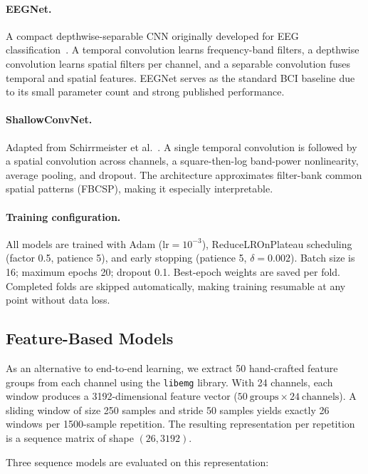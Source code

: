 \documentclass[11pt,twocolumn]{article}
\begin{document}
\paragraph{EEGNet.}
A compact depthwise-separable CNN originally developed for EEG
classification~\cite{lawhern2018eegnet}. A temporal convolution learns
frequency-band filters, a depthwise convolution learns spatial filters per
channel, and a separable convolution fuses temporal and spatial features.
EEGNet serves as the standard BCI baseline due to its small parameter count
and strong published performance.

\paragraph{ShallowConvNet.}
Adapted from Schirrmeister et al.~\cite{schirrmeister2017deep}. A single temporal
convolution is followed by a spatial convolution across channels, a
square-then-log band-power nonlinearity, average pooling, and dropout. The
architecture approximates filter-bank common spatial patterns (FBCSP), making it
especially interpretable.

\paragraph{Training configuration.}
All models are trained with Adam ($\text{lr} = 10^{-3}$),
ReduceLROnPlateau scheduling (factor 0.5, patience 5), and early stopping
(patience 5, $\delta = 0.002$). Batch size is 16; maximum epochs 20; dropout
0.1. Best-epoch weights are saved per fold. Completed folds are skipped
automatically, making training resumable at any point without data loss.

\subsection{Feature-Based Models}
\label{sec:feature}

As an alternative to end-to-end learning, we extract 50 hand-crafted feature
groups from each channel using the \texttt{libemg} library. With 24 channels, each
window produces a 3192-dimensional feature vector
($50\ \text{groups} \times 24\ \text{channels}$). A sliding window of size 250
samples and stride 50 samples yields exactly 26 windows per 1500-sample
repetition. The resulting representation per repetition is a sequence matrix of
shape $(26, 3192)$.

Three sequence models are evaluated on this representation:
\end{document}
